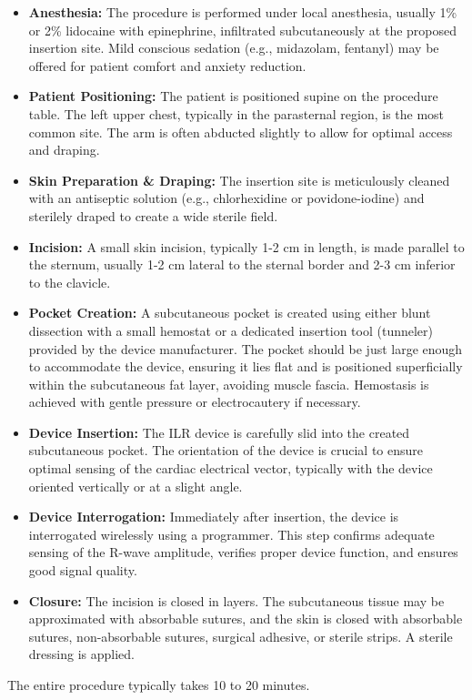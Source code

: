 \begin{itemize}
  \item \textbf{Anesthesia:} The procedure is performed under local anesthesia, usually 1\% or 2\% lidocaine with epinephrine, infiltrated subcutaneously at the proposed insertion site. Mild conscious sedation (e.g., midazolam, fentanyl) may be offered for patient comfort and anxiety reduction.
  \item \textbf{Patient Positioning:} The patient is positioned supine on the procedure table. The left upper chest, typically in the parasternal region, is the most common site. The arm is often abducted slightly to allow for optimal access and draping.
  \item \textbf{Skin Preparation \& Draping:} The insertion site is meticulously cleaned with an antiseptic solution (e.g., chlorhexidine or povidone-iodine) and sterilely draped to create a wide sterile field.
  \item \textbf{Incision:} A small skin incision, typically 1-2 cm in length, is made parallel to the sternum, usually 1-2 cm lateral to the sternal border and 2-3 cm inferior to the clavicle.
  \item \textbf{Pocket Creation:} A subcutaneous pocket is created using either blunt dissection with a small hemostat or a dedicated insertion tool (tunneler) provided by the device manufacturer. The pocket should be just large enough to accommodate the device, ensuring it lies flat and is positioned superficially within the subcutaneous fat layer, avoiding muscle fascia. Hemostasis is achieved with gentle pressure or electrocautery if necessary.
  \item \textbf{Device Insertion:} The ILR device is carefully slid into the created subcutaneous pocket. The orientation of the device is crucial to ensure optimal sensing of the cardiac electrical vector, typically with the device oriented vertically or at a slight angle.
  \item \textbf{Device Interrogation:} Immediately after insertion, the device is interrogated wirelessly using a programmer. This step confirms adequate sensing of the R-wave amplitude, verifies proper device function, and ensures good signal quality.
  \item \textbf{Closure:} The incision is closed in layers. The subcutaneous tissue may be approximated with absorbable sutures, and the skin is closed with absorbable sutures, non-absorbable sutures, surgical adhesive, or sterile strips. A sterile dressing is applied.
\end{itemize}
The entire procedure typically takes 10 to 20 minutes.

